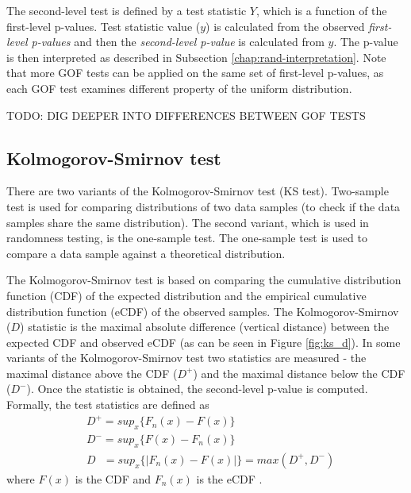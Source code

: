 \documentclass[
  digital,     %
  oneside,     %
  nosansbold,  %
  nocolorbold, %
  nolof,         %
  nolot,         %
]{fithesis4}
\begin{document}
The second-level test is defined by a test statistic $Y$, which is a function of the first-level p-values. Test statistic value ($y$) is calculated from the observed \emph{first-level p-values} and then the \emph{second-level p-value} is calculated from $y$. The p-value is then interpreted as described in Subsection \ref{chap:rand-interpretation}. Note that more GOF tests can be applied on the same set of first-level p-values, as each GOF test examines different property of the uniform distribution.


TODO: DIG DEEPER INTO DIFFERENCES BETWEEN GOF TESTS

\subsection{Kolmogorov-Smirnov test}
There are two variants of the Kolmogorov-Smirnov test (KS test). Two-sample test is used for comparing distributions of two data samples (to check if the data samples share the same distribution). The second variant, which is used in randomness testing, is the one-sample test. The one-sample test is used to compare a data sample against a theoretical distribution.

The Kolmogorov-Smirnov test is based on comparing the cumulative distribution function (CDF) of the expected distribution and the empirical cumulative distribution function (eCDF) of the observed samples. The Kolmogorov-Smirnov ($D$) statistic is the maximal absolute difference (vertical distance) between the expected CDF and observed eCDF (as can be seen in Figure \ref{fig:ks_d}). In some variants of the Kolmogorov-Smirnov test two statistics are measured - the maximal distance above the CDF ($D^+$) and the maximal distance below the CDF ($D^-$). Once the statistic is obtained, the second-level p-value is computed. Formally, the test statistics are defined as
\[\begin{split}
    &D^+ = sup_x\{F_n(x) - F(x)\}\\
    &D^- = sup_x\{F(x) - F_n(x)\}\\
    &D \:\:\:= sup_x\{|F_n(x) - F(x)|\} = max(D^+, D^-)
\end{split}
\] where $F(x)$ is the CDF and $F_n(x)$ is the  eCDF \cite[p. 100]{GOF-techniques}.
\end{document}
